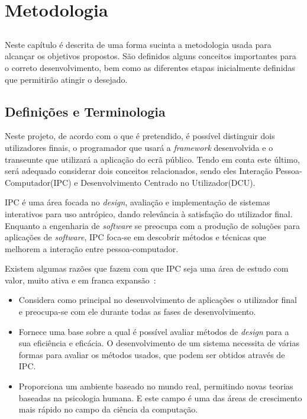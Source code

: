 \chapter{Metodologia} \label{chap:metod}

\section*{}

Neste capítulo é descrita de uma forma sucinta a metodologia usada para alcançar os objetivos propostos. São definidos alguns conceitos importantes para o correto desenvolvimento, bem como as diferentes etapas inicialmente definidas que permitirão atingir o desejado.

\section{Definições e Terminologia}

Neste projeto, de acordo com o que é pretendido, é possível distinguir dois utilizadores finais, o programador que usará a \textit{framework} desenvolvida e o transeunte que utilizará a aplicação do ecrã público. Tendo em conta este último, será adequado considerar dois conceitos relacionados, sendo eles Interação Pessoa-Computador(IPC) e Desenvolvimento Centrado no Utilizador(DCU).

IPC é uma área focada no \textit{design}, avaliação e implementação de sistemas interativos para uso antrópico, dando relevância à satisfação do utilizador final. 
Enquanto a engenharia de \textit{software} se preocupa com a produção de soluções para aplicações de \textit{software}, IPC foca-se em descobrir métodos e técnicas que melhorem a interação entre pessoa-computador.


Existem algumas razões que fazem com que IPC seja uma área de estudo com valor, muito ativa e em franca expansão~\cite{smith2006human}:
\begin{itemize}
	\item Considera como principal no desenvolvimento de aplicações o utilizador final e preocupa-se com ele durante todas as fases de desenvolvimento.
	\item Fornece uma base sobre a qual é possível avaliar métodos de \textit{design} para a sua eficiência e eficácia. O desenvolvimento de um sistema necessita de várias formas para avaliar os métodos usados, que podem ser obtidos através de IPC.
	\item Proporciona um ambiente baseado no mundo real, permitindo novas teorias baseadas na psicologia humana. E este campo é uma das áreas de crescimento mais rápido no campo da ciência da computação.
\end{itemize}

